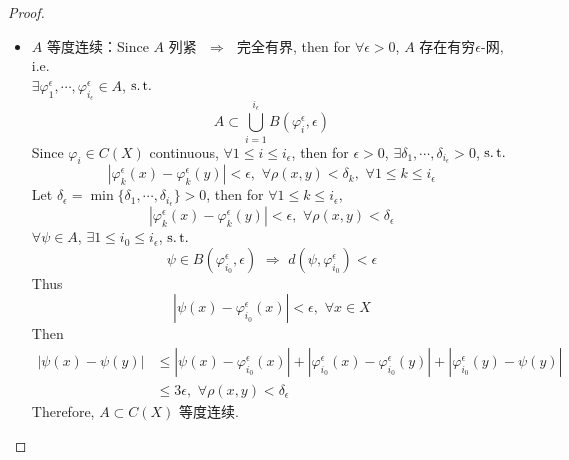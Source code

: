 \begin{thm}
\begin{proof}
\begin{enumerate}
\begin{itemize}
					\item $A$ 等度连续：Since $A$ 列紧 $\,\, \Rightarrow \,\,$ 完全有界, then for $\forall \epsilon > 0$, $A$ 存在有穷$\epsilon$-网, i.e. \\
					$\exists \varphi_{1}^\epsilon , \cdots , \varphi_{i_\epsilon}^\epsilon \in A$, $\operatorname{s.t.}$
					\[ A \subset \bigcup_{i = 1}^{i_\epsilon} B(\varphi_{i}^\epsilon , \epsilon) \]
					Since $\varphi_i \in C(X)$ continuous, $\forall 1 \leq i \leq i_\epsilon$, then for $\epsilon > 0$, $\exists \delta_1 , \cdots , \delta_{i_\epsilon} > 0$, $\operatorname{s.t.}$
					\[ \left| \varphi_{k}^\epsilon(x) - \varphi_{k}^\epsilon(y) \right| < \epsilon , \,\, \forall \rho(x , y) < \delta_k , \,\, \forall 1 \leq k \leq i_\epsilon \]
					Let $\delta_\epsilon = \min \{ \delta_1 , \cdots , \delta_{i_\epsilon} \} > 0$, then for $\forall 1 \leq k \leq i_\epsilon$, 
					\[ \left| \varphi_{k}^\epsilon(x) - \varphi_{k}^\epsilon(y) \right| < \epsilon , \,\, \forall \rho(x , y) < \delta_\epsilon \]
					$\forall \psi \in A$, $\exists 1 \leq i_0 \leq i_\epsilon$, $\operatorname{s.t.}$
					\[ \psi \in B(\varphi_{i_0}^\epsilon , \epsilon) \,\, \Rightarrow \,\, d(\psi , \varphi_{i_0}^\epsilon) < \epsilon \]
					Thus
					\[ \left| \psi(x) - \varphi_{i_0}^\epsilon (x) \right| < \epsilon , \,\, \forall x \in X \]
					Then
					\begin{align}
						\left| \psi(x) - \psi(y) \right| 
						&\leq \left| \psi(x) - \varphi_{i_0}^\epsilon(x) \right| + \left| \varphi_{i_0}^\epsilon(x) - \varphi_{i_0}^\epsilon(y) \right| + \left| \varphi_{i_0}^\epsilon(y) - \psi(y) \right| \\
						&\leq 3\epsilon , \,\, \forall \rho(x , y) < \delta_\epsilon
					\end{align}
					Therefore, $A \subset C(X)$ 等度连续.
				\end{itemize}
				
				\vspace{8em}
				

\end{enumerate}
\end{proof}
\end{thm}
